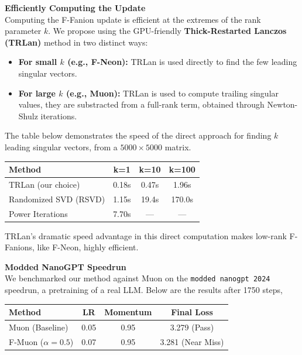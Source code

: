 \documentclass[fontsize=10pt]{beamer}
\begin{document}
\begin{frame}[fragile]
\begin{columns}[T]
\begin{column}{0.30\textwidth}
\vspace{0.5em}
\textbf{\Huge\color{Zen}Efficiently Computing the Update}\\[0.3em]

Computing the F-Fanion update is efficient at the extremes of the rank parameter $k$. We propose using the GPU-friendly \textbf{\color{HazySummerEve}Thick-Restarted Lanczos (TRLan)} method in two distinct ways:
\begin{itemize}
    \item \textbf{\color{HazySummerEve}For small $k$ (e.g., F-Neon):} TRLan is used directly to find the few leading singular vectors.
    \item \textbf{\color{HazySummerEve}For large $k$ (e.g., Muon):} TRLan is used to compute trailing singular values, they are substracted from a full-rank term, obtained through Newton-Shulz iterations.
\end{itemize}

The table below demonstrates the speed of the direct approach for finding $k$ leading singular vectors, from a $5000 \times 5000$ matrix. 

{
\centering
\begin{tabular}{lccc}
\toprule
\textbf{Method} & \textbf{k=1} & \textbf{k=10} & \textbf{k=100} \\
\midrule
TRLan (our choice) & 0.18s & 0.47s & 1.96s \\
Randomized SVD (RSVD)       & 1.15s          & 19.4s          & 170.0s \\
Power Iterations            & 7.70s          & ---            & --- \\
\bottomrule
\end{tabular}
\par
\vspace{0.5em}
}

TRLan's dramatic speed advantage in this direct computation makes low-rank F-Fanions, like F-Neon, highly efficient.

\vspace{0.5em}
\textbf{\Huge\color{Zen}Modded NanoGPT Speedrun}\\[0.3em]

We benchmarked our method against Muon on the \texttt{modded nanogpt 2024} speedrun, a pretraining of a real LLM. Below are the results after 1750 steps, 

{
\centering
\begin{tabular}{lccc}
\toprule
\textbf{Method} & \textbf{LR} & \textbf{Momentum} & \textbf{Final Loss} \\
\midrule
Muon (Baseline) & 0.05 & 0.95 & 3.279 (Pass) \\
F-Muon ($\alpha=0.5$) & 0.07 & 0.95 & 3.281 (Near Miss) \\
\bottomrule
\end{tabular}
\par
}


\end{column}
\end{columns}
\end{frame}
\end{document}
